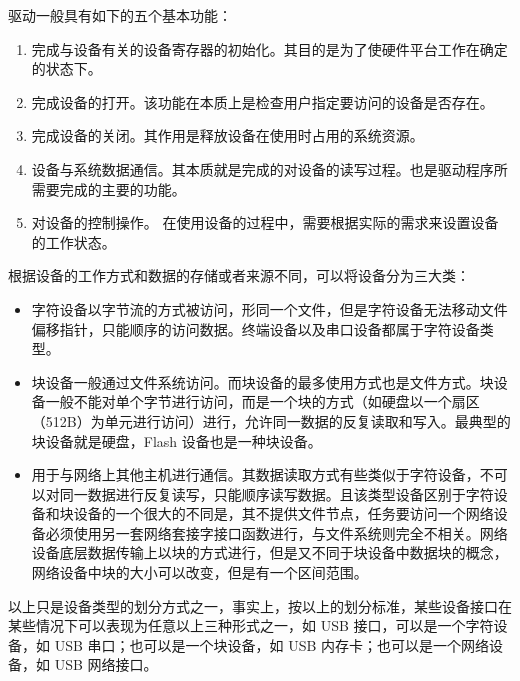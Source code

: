 \noindent 驱动一般具有如下的五个基本功能：
	\begin{enumerate}
	\item 完成与设备有关的设备寄存器的初始化。其目的是为了使硬件平台工作在确定的状态下。
	
	\item 完成设备的打开。该功能在本质上是检查用户指定要访问的设备是否存在。
	
	\item 完成设备的关闭。其作用是释放设备在使用时占用的系统资源。
	
	\item 设备与系统数据通信。其本质就是完成的对设备的读写过程。也是驱动程序所需要完成的主要的功能。
	
	\item 对设备的控制操作。 在使用设备的过程中，需要根据实际的需求来设置设备的工作状态。
	\end{enumerate}	
	

\noindent 根据设备的工作方式和数据的存储或者来源不同，可以将设备分为三大类：
\begin{itemize}
\item {}

	字符设备以字节流的方式被访问，形同一个文件，但是字符设备无法移动文件偏移指针，只能顺序的访问数据。终端设备以及串口设备都属于字符设备类型。

\item {}

	块设备一般通过文件系统访问。而块设备的最多使用方式也是文件方式。块设备一般不能对单个字节进行访问，而是一个块的方式（如硬盘以一个扇区（512B）为单元进行访问）进行，允许同一数据的反复读取和写入。最典型的块设备就是硬盘，Flash 设备也是一种块设备。
	
\item {}

	用于与网络上其他主机进行通信。其数据读取方式有些类似于字符设备，不可以对同一数据进行反复读写，只能顺序读写数据。且该类型设备区别于字符设备和块设备的一个很大的不同是，其不提供文件节点，任务要访问一个网络设备必须使用另一套网络套接字接口函数进行，与文件系统则完全不相关。网络设备底层数据传输上以块的方式进行，但是又不同于块设备中数据块的概念，网络设备中块的大小可以改变，但是有一个区间范围。
	
\end{itemize}

	以上只是设备类型的划分方式之一，事实上，按以上的划分标准，某些设备接口在某些情况下可以表现为任意以上三种形式之一，如 USB 接口，可以是一个字符设备，如 USB 串口；也可以是一个块设备，如 USB 内存卡；也可以是一个网络设备，如 USB 网络接口。

